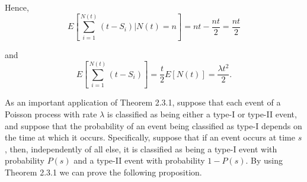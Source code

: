 \documentclass[lang=cn,10pt,thmcnt=section]{elegantbook}
\begin{document}
Hence,
\[
E\left[\sum_{i=1}^{N(t)} (t - S_i) \bigg| N(t) = n \right] = n t - \frac{n t}{2} = \frac{n t}{2}
\]

and
\[
E\left[\sum_{i=1}^{N(t)} (t - S_i) \right] = \frac{t}{2} E[N(t)] = \frac{\lambda t^2}{2}.
\]

As an important application of Theorem 2.3.1, suppose that each event of a Poisson process with rate \(\lambda\) is classified as being either a type-I or type-II event, and suppose that the probability of an event being classified as type-I depends on the time at which it occurs. Specifically, suppose that if an event occurs at time \( s \), then, independently of all else, it is classified as being a type-I event with probability \( P(s) \) and a type-II event with probability \( 1 - P(s) \). By using Theorem 2.3.1 we can prove the following proposition.
\end{document}
